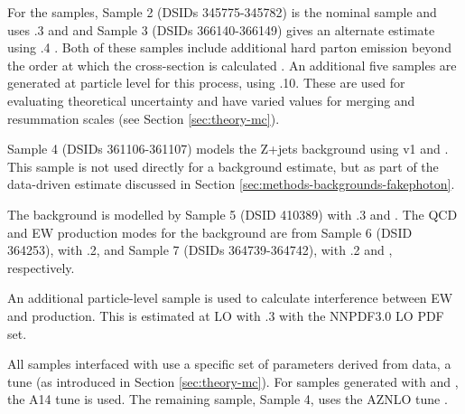 For the \QCDZy samples, Sample 2 (\acp{DSID} 345775-345782) is the nominal
sample and uses .3 and  and Sample 3
(\acp{DSID} 366140-366149) gives an alternate estimate using .4
\cite{sherpa2dot2}. Both of these samples include additional hard parton emission
beyond the order at which the cross-section is calculated \cite{VBSZy-CONF}. An
additional five samples are generated at particle level for this process, using
.10. These are used for evaluating theoretical uncertainty and have
varied values for merging and resummation scales (see Section
\ref{sec:theory-mc}).

Sample 4 (\acp{DSID} 361106-361107) models the Z+jets background using
\powhegbox v1 \cite{Nason2004,powheg,powhegbox} and 
\cite{pythia8dot1}.  This sample is not used directly for a background estimate,
but as part of the data-driven estimate discussed in Section
\ref{sec:methods-backgrounds-fakephoton}.

The \tty background is modelled by Sample 5 (\ac{DSID} 410389) with
.3 and .  The \ac{QCD} and \ac{EW} production
modes for the \WZjj background are from Sample 6 (\ac{DSID} 364253), with
.2, and Sample 7 (\acp{DSID} 364739-364742), with .2 and , respectively.

An additional particle-level sample is used to calculate interference between
\ac{EW} and \QCDZy production. This is estimated at \ac{LO} with
.3 with the NNPDF3.0 \ac{LO} \ac{PDF} set.

All samples interfaced with \pythia use a specific set of parameters derived
from data, a tune (as introduced in Section \ref{sec:theory-mc}). For samples
generated with \madgraph and \pythia, the A14 tune \cite{A14tune} is used. The
remaining \pythia sample, Sample 4, uses
the AZNLO tune \cite{AZNLOtune}.

%
